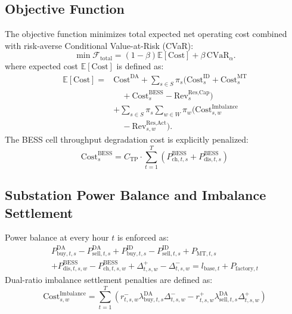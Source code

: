 \documentclass[journal]{IEEEtran}
\begin{document}
\subsection{Objective Function}
The objective function minimizes total expected net operating cost combined with risk-averse Conditional Value-at-Risk (CVaR):
\begin{equation}
\min \mathcal{F}_{\text{total}}
= (1-\beta)\mathbb{E}[\text{Cost}]
+ \beta\,\mathrm{CVaR}_{\alpha}.
\label{eq:total_objective}
\end{equation}
where expected cost $\mathbb{E}[\text{Cost}]$ is defined as:
\begin{align}
\mathbb{E}[\text{Cost}]
={}& \text{Cost}^{\text{DA}}
+ \sum_{s\in S}\pi_s \Big(
\text{Cost}_{s}^{\text{ID}}
+ \text{Cost}_{s}^{\text{MT}} \nonumber\\
&\quad + \text{Cost}_{s}^{\text{BESS}}
- \text{Rev}_{s}^{\text{Res,Cap}}
\Big) \nonumber\\
&+ \sum_{s\in S}\pi_s\sum_{w\in W}\pi_w
\Big(
\text{Cost}_{s,w}^{\text{Imbalance}} \nonumber\\
&\quad - \text{Rev}_{s,w}^{\text{Res,Act}}
\Big).
\end{align}
The BESS cell throughput degradation cost is explicitly penalized:
\begin{equation}
\text{Cost}_{s}^{\text{BESS}} = C_{\text{TP}} \cdot \sum_{t=1}^{T} \left( P_{\text{ch},t,s}^{\text{BESS}} + P_{\text{dis},t,s}^{\text{BESS}} \right)
\end{equation}

\subsection{Substation Power Balance and Imbalance Settlement}
Power balance at every hour $t$ is enforced as:
\begin{align}
P_{\text{buy},t,s}^{\text{DA}} - P_{\text{sell},t,s}^{\text{DA}} + P_{\text{buy},t,s}^{\text{ID}} - P_{\text{sell},t,s}^{\text{ID}} + P_{\text{MT},t,s} \nonumber \\
+ P_{\text{dis},t,s,w}^{\text{BESS}} - P_{\text{ch},t,s,w}^{\text{BESS}} + \Delta_{t,s,w}^+ - \Delta_{t,s,w}^- = l_{\text{base},t} + P_{\text{factory},t}
\end{align}
Dual-ratio imbalance settlement penalties are defined as:
\begin{equation}
\text{Cost}_{s,w}^{\text{Imbalance}} = \sum_{t=1}^{T} \left( r_{t,s,w}^- \lambda_{\text{buy},t,s}^{\text{DA}} \Delta_{t,s,w}^- - r_{t,s,w}^+ \lambda_{\text{sell},t,s}^{\text{DA}} \Delta_{t,s,w}^+ \right)
\end{equation}
\end{document}

